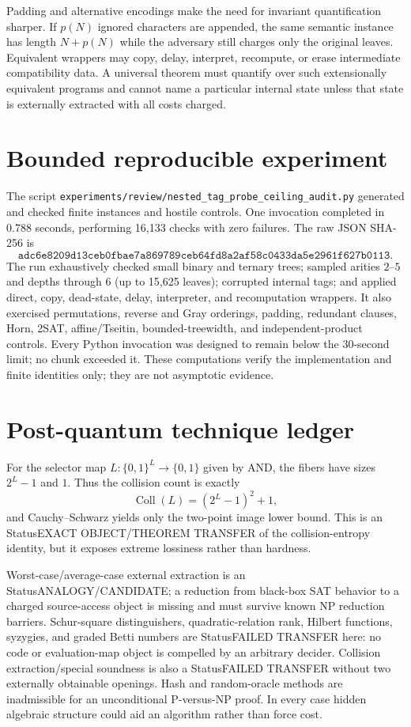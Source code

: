 \documentclass[11pt]{article}
\begin{document}
Padding and alternative encodings make the need for invariant quantification sharper.  If $p(N)$ ignored characters are appended, the same semantic instance has length $N+p(N)$ while the adversary still charges only the original leaves.  Equivalent wrappers may copy, delay, interpret, recompute, or erase intermediate compatibility data.  A universal theorem must quantify over such extensionally equivalent programs and cannot name a particular internal state unless that state is externally extracted with all costs charged.

\section{Bounded reproducible experiment}

The script \texttt{experiments/review/nested\_tag\_probe\_ceiling\_audit.py} generated and checked finite instances and hostile controls.  One invocation completed in 0.788 seconds, performing 16,133 checks with zero failures.  The raw JSON SHA-256 is
\[
\texttt{adc6e8209d13ceb0fbae7a869789ceb64fd8a2af58c0433da5e2961f627b0113}.
\]
The run exhaustively checked small binary and ternary trees; sampled arities $2$--$5$ and depths through $6$ (up to 15,625 leaves); corrupted internal tags; and applied direct, copy, dead-state, delay, interpreter, and recomputation wrappers.  It also exercised permutations, reverse and Gray orderings, padding, redundant clauses, Horn, 2SAT, affine/Tseitin, bounded-treewidth, and independent-product controls.  Every Python invocation was designed to remain below the 30-second limit; no chunk exceeded it.  These computations verify the implementation and finite identities only; they are not asymptotic evidence.

\section{Post-quantum technique ledger}

For the selector map $L:\{0,1\}^L\to\{0,1\}$ given by AND, the fibers have sizes $2^L-1$ and $1$.  Thus the collision count is exactly
\[
  \operatorname{Coll}(L)=(2^L-1)^2+1,
\]
and Cauchy--Schwarz yields only the two-point image lower bound.  This is an Status{EXACT OBJECT/THEOREM TRANSFER} of the collision-entropy identity, but it exposes extreme lossiness rather than hardness.

Worst-case/average-case external extraction is an Status{ANALOGY/CANDIDATE}; a reduction from black-box SAT behavior to a charged source-access object is missing and must survive known NP reduction barriers.  Schur-square distinguishers, quadratic-relation rank, Hilbert functions, syzygies, and graded Betti numbers are Status{FAILED TRANSFER} here: no code or evaluation-map object is compelled by an arbitrary decider.  Collision extraction/special soundness is also a Status{FAILED TRANSFER} without two externally obtainable openings.  Hash and random-oracle methods are inadmissible for an unconditional P-versus-NP proof.  In every case hidden algebraic structure could aid an algorithm rather than force cost.
\end{document}
